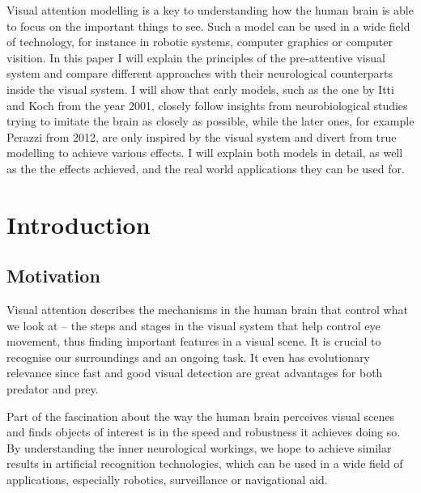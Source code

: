 \documentclass[a4paper,12pt,fleqn,oneside]{scrartcl}
\begin{document}
\begin{titlepage}
\begin{minipage}{0.8\textwidth}
{        Visual attention modelling is a key to understanding how the human brain is able to focus on the important
        things to see. Such a model can be used in a wide field of technology, for instance in robotic systems,
        computer graphics or computer visition. In this paper I will explain the principles of the pre-attentive visual
        system and compare different approaches with their neurological counterparts inside the visual system. I will
        show that early models, such as the one by Itti and Koch from the year 2001, closely follow insights from
        neurobiological studies trying to imitate the brain as closely as possible, while the later ones, for example
        Perazzi from 2012, are only inspired by the visual system and divert from true modelling to achieve various
        effects. I will explain both models in detail, as well as the the effects achieved, and the real world
        applications they can be used for.

    }
    \end{minipage}

\end{titlepage}

\tableofcontents

\newpage
\section{Introduction}

\subsection{Motivation}

Visual attention describes the mechanisms in the human brain that control what we look at -- the steps and stages
in the visual system that help control eye movement, thus finding important features in a visual scene. It is crucial to
recognise our surroundings and an ongoing task. It even has evolutionary relevance since fast and good visual detection
are great advantages for both predator and prey.

Part of the fascination about the way the human brain perceives visual scenes and finds objects of interest is in the
speed and robustness it achieves doing so. By understanding the inner neurological workings, we hope to achieve similar
results in artificial recognition technologies, which can be used in a wide field of applications, especially robotics,
surveillance or navigational aid.
\end{document}
